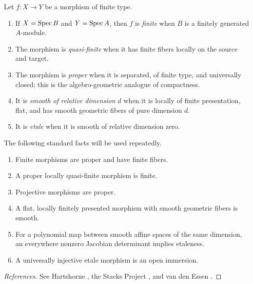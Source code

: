 \begin{definition}\label{def:morphism-types}
Let $f\colon X\to Y$ be a morphism of finite type.
\begin{enumerate}[label=\textup{(\alph*)},leftmargin=2.5em]
\item If $X=\operatorname{Spec} B$ and $Y=\operatorname{Spec} A$, then $f$ is \emph{finite} when $B$ is a finitely generated $A$-module.
\item The morphism is \emph{quasi-finite} when it has finite fibers locally on the source and target.
\item The morphism is \emph{proper} when it is separated, of finite type, and universally closed; this is the algebro-geometric analogue of compactness.
\item It is \emph{smooth of relative dimension $d$} when it is locally of finite presentation, flat, and has smooth geometric fibers of pure dimension $d$.
\item It is \emph{etale} when it is smooth of relative dimension zero.
\end{enumerate}
\end{definition}

\begin{recalledtheorem}\label{thm:basic-morphism-facts}
The following standard facts will be used repeatedly.
\begin{enumerate}[label=\textup{(\alph*)},leftmargin=2.5em]
\item Finite morphisms are proper and have finite fibers.
\item A proper locally quasi-finite morphism is finite.
\item Projective morphisms are proper.
\item A flat, locally finitely presented morphism with smooth geometric fibers is smooth.
\item For a polynomial map between smooth affine spaces of the same dimension, an everywhere nonzero Jacobian determinant implies etaleness.
\item A universally injective etale morphism is an open immersion.
\end{enumerate}
\end{recalledtheorem}

\begin{proof}[References]
See Hartshorne \cite[Chapter II, Section 4]{Hartshorne1977}, the Stacks Project \cite[Tags 0F2P, 01W7, 01W0, 01V4, 02GH, and 02LC]{StacksProject}, and van den Essen \cite[Chapter 1]{vanDenEssen2000}.
\end{proof}

